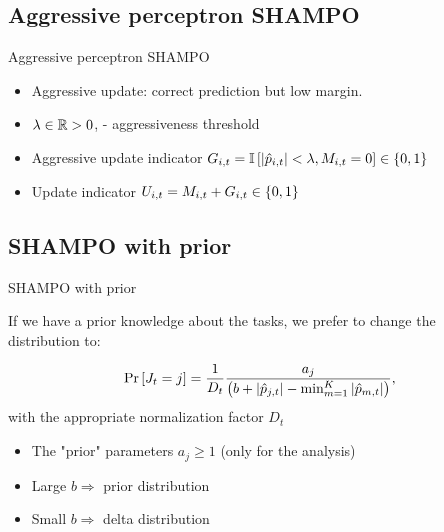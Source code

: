 \documentclass{beamer}
\begin{document}
\subsection{Aggressive perceptron SHAMPO}

\begin{frame}{Aggressive perceptron SHAMPO  }
\begin{itemize}
\item Aggressive update: correct prediction but low margin.\newline
\item $\lambda\in \mathbb{R}>0$, -  aggressiveness threshold\newline
\item Aggressive update indicator $G_{i,t}=\mathbb{I}\left[{\left\vert{\hat{p}_{i,t}}\right\vert<\lambda,M_{i,t}=0}\right]\in\left\{{0,1}\right\}$\newline
\item Update  indicator $U_{i,t}=M_{i,t}+G_{i,t}\in\left\{{0,1}\right\}$\newline
\end{itemize}
\end{frame}


\subsection{SHAMPO with prior}

 \begin{frame}{SHAMPO with prior}

 If we have a prior knowledge about the  tasks, we prefer  to change the distribution to:\newline

 \begin{equation*}
 {\rm Pr}\left[{J_t=j}\right] =
 \frac{1}{D_{t}}\frac{a_{j}}{\left({b+\left\vert{\hat{p}_{j,t}}\right\vert-\min_{m=1}^K\left\vert{\hat{p}_{m,t}}\right\vert}\right)}, \end{equation*}\newline
 with the appropriate normalization factor $D_t$\newline
 \begin{itemize}
 \item The "prior" parameters $a_j\ge1$ (only for the analysis)\newline
 \item Large $b\Rightarrow$ prior distribution \newline
 \item Small $b\Rightarrow$ delta distribution\newline
 \end{itemize}
 \end{frame}
\end{document}
